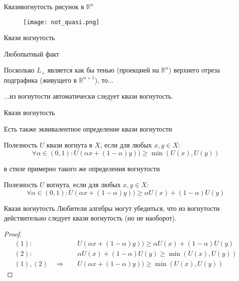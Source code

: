 \documentclass{beamer}
\begin{document}
\begin{frame}{Квазивогнутость}
\centering рисунок в $\mathbb{R}^n$
\begin{figure}[hbt]
\centering
\texttt{[image: not\_quasi.png]}
\end{figure}
\end{frame}

\begin{frame}{Квази вогнутость}

Любопытный факт

Посколько $L_+$ является как бы тенью (проекцией на $\mathbb{R}^n$) верхнего отреза подграфика (живущего в $\mathbb{R}^{n+1}$), то...

...\alert{из вогнутости автоматически следует квази вогнутость}.

\end{frame}

\begin{frame}{Квази вогнутость}

Есть также эквивалентное определение квази вогнутости

\begin{definition}
Полезность $U$ \alert{квази вогнута} в $X$, если для любых $x, y \in X$:
$$ \forall \alpha \in (0,1): U(\alpha x + (1-\alpha) y)) \geqslant \min(U(x), U(y))$$
\end{definition}
в стиле примерно такого же определения вогнутости
\begin{definition}
Полезность $U$ \alert{вогнута}, если для любых $x, y \in X$: 
$$ \forall \alpha \in (0,1): U(\alpha x + (1-\alpha) y)) \geqslant \alpha U(x) + (1-\alpha) U(y)$$
\end{definition}

\end{frame}

\begin{frame}{Квази вогнутость}
Любители алгебры могут убедиться, что \alert{из вогнутости действительно следует квази вогнутость} (но не наоборот).
\begin{proof}
\begin{align*} 
(1) : & \quad U(\alpha x + (1-\alpha) y)) \geqslant \alpha U(x) + (1-\alpha) U(y) \\
(2) : & \quad \alpha U(x) + (1-\alpha) U(y) \geqslant \min (U(x), U(y))\\
(1), (2) \quad \Rightarrow & \quad U(\alpha x + (1-\alpha) y)) \geqslant \min (U(x), U(y))
\end{align*}
\end{proof}

\end{frame}
\end{document}
